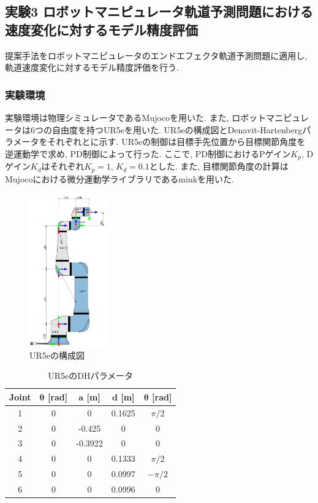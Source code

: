 \subsection{実験3 ロボットマニピュレータ軌道予測問題における速度変化に対するモデル精度評価}
提案手法をロボットマニピュレータのエンドエフェクタ軌道予測問題に適用し, 軌道速度変化に対するモデル精度評価を行う.

\subsubsection{実験環境}
実験環境は物理シミュレータであるMujoco\cite{mujoco}を用いた.
また, ロボットマニピュレータは6つの自由度を持つUR5eを用いた.
UR5eの構成図とDenavit-Hartenbergパラメータをそれぞれとに示す.
UR5eの制御は目標手先位置から目標関節角度を逆運動学で求め, PD制御によって行った.
ここで, PD制御におけるPゲイン$K_p$, Dゲイン$K_d$はそれぞれ$K_p=1$, $K_d=0.1$とした.
また, 目標関節角度の計算はMujocoにおける微分運動学ライブラリであるmink\cite{mink}を用いた.
\begin{figure}[htb]
    \centering
    \includegraphics[width=0.3\textwidth]{Static/ur5e_structure.png}
    \caption[UR5eの構成図]{
        UR5eの構成図\cite{ur5e}
    }
    \label{fig:ur5e:structure}
\end{figure}

\begin{table}[htb]
    \centering
    \caption[UR5eのDHパラメータ]{
        UR5eのDHパラメータ\cite{ur5e}
    }
    \label{tab:ur5e:dh}
    \begin{tabular}{ccccc}
        \hline
        \textbf{Joint} & $\bm{\theta}$ [rad] & $\bm{a}$ [m]& $\bm{d}$ [m]& $\bm{\theta}$ [rad]\\
        \hline
        1 & 0 & 0       & 0.1625 & $\pi/2$\\
        2 & 0 & -0.425  & 0       & 0\\
        3 & 0 & -0.3922 & 0       & 0\\
        4 & 0 & 0       & 0.1333 & $\pi/2$\\
        5 & 0 & 0       & 0.0997 & $-\pi/2$\\
        6 & 0 & 0       & 0.0996 & 0\\
        \hline
    \end{tabular}
\end{table}


